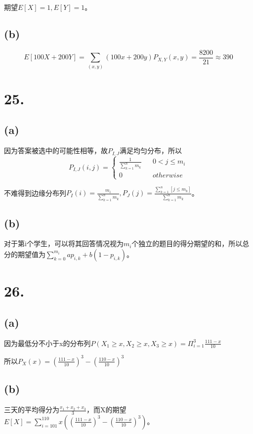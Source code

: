 \documentclass[UTF8]{report}
\begin{document}
            期望$E[X] = 1, E[Y] = 1$。
        \subsection*{(b)}
            $$E[100X + 200Y] = \sum_{(x, y)}(100x + 200y)P_{X, Y}(x, y) = \frac{8200}{21} \approx 390$$
    \section*{25.}
        \subsection*{(a)}
            因为答案被选中的可能性相等，故$P_{I, J}$满足均匀分布，所以
            $$P_{I, J}(i, j) = \left\{
                \begin{array}{lcr}
                    \frac{1}{\sum_{k = 1}^{n}m_k} & & 0 < j \leq m_i\\
                    0 & & otherwise
                \end{array}
                \right.$$

            不难得到边缘分布列$P_I(i) = \frac{m_i}{\sum_{k = 1}^{n}m_k}, P_J(j) = \frac{\sum_{k = 1}^{n}[j \leq m_k]}{\sum_{k = 1}^{n}m_k}$。
        \subsection*{(b)}
            对于第i个学生，可以将其回答情况视为$m_i$个独立的题目的得分期望的和，所以总分的期望值为$\sum_{k = 0}^{m_i}ap_{i, k} + b(1 - p_{i, k})$。
    \section*{26.}
        \subsection*{(a)}
            因为最低分不小于x的分布列$P(X_1 \geq x, X_2 \geq x, X_3 \geq x) = \Pi_{i = 1}^3\frac{111 - x}{10}$

            所以$P_X(x) = (\frac{111 - x}{10})^3 - (\frac{110 - x}{10})^3$
        \subsection*{(b)}
            三天的平均得分为$\frac{x_1 + x_2 + x_3}{3}$，而X的期望$E[X] = \sum_{i = 101}^{110}x((\frac{111 - x}{10})^3 - (\frac{110 - x}{10})^3)$。
\end{document}

